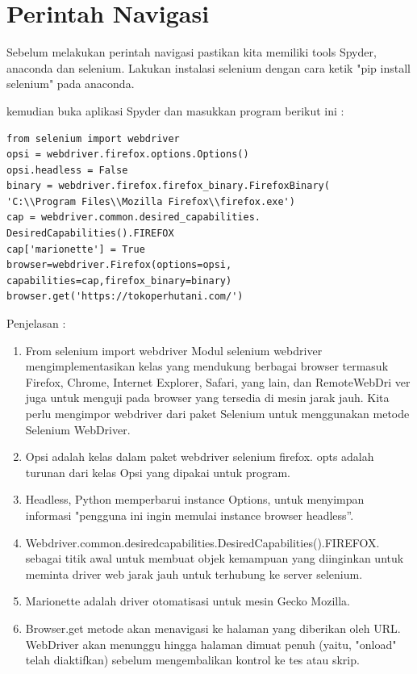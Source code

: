 
\section{Perintah Navigasi}
Sebelum melakukan perintah navigasi pastikan kita memiliki tools Spyder, anaconda dan selenium. Lakukan instalasi selenium dengan cara ketik "pip install selenium" pada anaconda.

kemudian buka aplikasi Spyder dan masukkan program berikut ini :
\begin{verbatim}
from selenium import webdriver
opsi = webdriver.firefox.options.Options()
opsi.headless = False
binary = webdriver.firefox.firefox_binary.FirefoxBinary(
'C:\\Program Files\\Mozilla Firefox\\firefox.exe')
cap = webdriver.common.desired_capabilities.
DesiredCapabilities().FIREFOX
cap['marionette'] = True
browser=webdriver.Firefox(options=opsi,
capabilities=cap,firefox_binary=binary)
browser.get('https://tokoperhutani.com/')
\end{verbatim}

Penjelasan : 
\begin{enumerate}
	\item From selenium import webdriver Modul selenium webdriver mengimplementasikan kelas yang mendukung berbagai browser termasuk Firefox, Chrome, Internet Explorer, Safari, yang lain, dan RemoteWebDri	ver juga untuk menguji pada browser yang tersedia di mesin jarak jauh. Kita perlu mengimpor webdriver dari paket Selenium untuk menggunakan metode Selenium WebDriver.
	\item Opsi adalah kelas dalam paket webdriver selenium firefox. opts adalah turunan dari kelas Opsi yang dipakai untuk program.
	\item Headless, Python memperbarui instance Options, untuk menyimpan informasi "pengguna ini ingin memulai instance browser headless”.
	\item Webdriver.common.desiredcapabilities.DesiredCapabilities().FIREFOX.   sebagai titik awal untuk membuat objek kemampuan yang diinginkan untuk meminta driver web jarak jauh untuk terhubung ke server selenium.  
	\item Marionette adalah driver otomatisasi untuk mesin Gecko Mozilla.
	\item Browser.get metode akan menavigasi ke halaman yang diberikan oleh URL. WebDriver akan menunggu hingga halaman dimuat penuh (yaitu, "onload" telah diaktifkan) sebelum mengembalikan kontrol ke tes atau skrip.
\end{enumerate}

